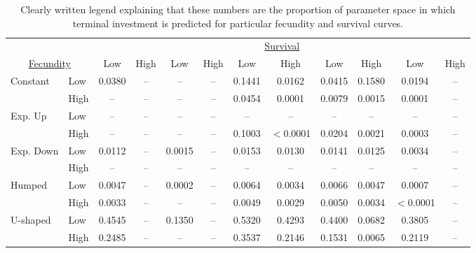\documentclass[12pt,review,authoryear]{elsarticle}
\begin{document}
\begin{sidewaystable}
\begin{center}
\begin{tabular}{llcccccccccc}
\hline
& & \multicolumn{10}{c}{\underline{Survival}}
& & & \multicolumn{2}{c}{Constant} & \multicolumn{2}{c}{Exp. Up}  &  \multicolumn{2}{c}{Exp. Down} &  \multicolumn{2}{c}{Humped}  & \multicolumn{2}{c}{U-shaped} \\
\multicolumn{2}{c}{\underline{Fecundity}}& Low & High &  Low & High & Low & High & Low & High & Low & High \\
\hline
\multirow{ 2}{*}{Constant}   & Low   & 0.0380 & -- & -- & -- & 0.1441 & 0.0162 & 0.0415 & 0.1580 & 0.0194 & -- \\
                             & High  & -- & -- &  -- & -- & 0.0454 & 0.0001 & 0.0079 & 0.0015 & 0.0001 & -- \\
\multirow{ 2}{*}{Exp. Up}    & Low   & -- & -- & -- & -- & -- & -- & -- & -- & -- & -- \\
                             & High  & -- & -- & -- & -- & 0.1003 & $<$0.0001 & 0.0204 & 0.0021 & 0.0003 & -- \\
\multirow{ 2}{*}{Exp. Down}  & Low   & 0.0112 & -- & 0.0015 & -- & 0.0153 & 0.0130 & 0.0141 & 0.0125 & 0.0034 & -- \\
                             & High  & -- & -- & -- & -- & -- & -- & -- & -- & -- & -- \\
\multirow{ 2}{*}{Humped}     & Low   & 0.0047 & -- & 0.0002 & -- & 0.0064 & 0.0034 & 0.0066 & 0.0047 & 0.0007 & -- \\
                             & High  & 0.0033 & -- &  -- & -- & 0.0049 & 0.0029 & 0.0050 & 0.0034 & $<$0.0001 & -- \\
\multirow{ 2}{*}{U-shaped}   & Low   & 0.4545 & -- &  0.1350 & -- & 0.5320 & 0.4293 & 0.4400 & 0.0682 & 0.3805 & -- \\
                             & High  & 0.2485 & -- & -- & -- & 0.3537 & 0.2146 & 0.1531 & 0.0065 & 0.2119 & -- \\
\hline
\end{tabular}
\end{center}
\caption{Clearly written legend explaining that these numbers are the proportion of parameter space in which terminal investment is predicted for particular fecundity and survival curves.}
\end{sidewaystable}
\end{document}
